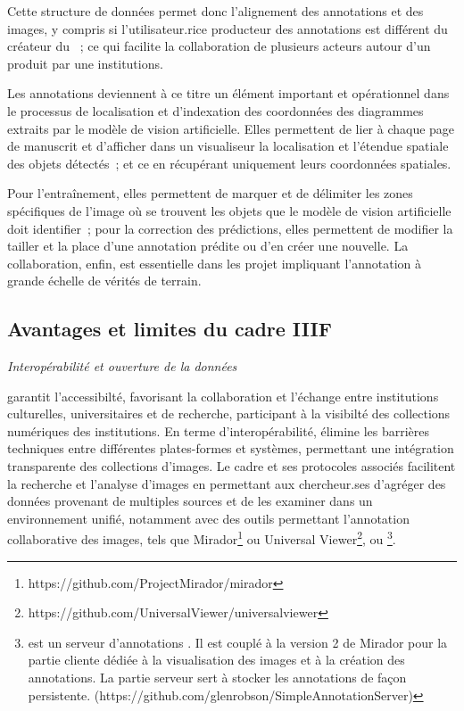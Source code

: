 Cette structure de données permet donc l'alignement des annotations et
des images, y compris si l'utilisateur.rice producteur des annotations est
différent du créateur du \man~; ce qui facilite la collaboration de plusieurs acteurs autour d'un \man produit
par une institutions.

Les annotations deviennent à ce titre un élément important et
opérationnel dans le processus de localisation et d'indexation des
coordonnées des diagrammes extraits par le modèle de vision
artificielle. Elles permettent de lier à chaque page de manuscrit et
d'afficher dans un visualiseur la localisation et l'étendue spatiale des objets détectés~; et ce en
récupérant uniquement leurs coordonnées spatiales.

Pour l'entraînement, elles permettent de marquer et de délimiter les
zones spécifiques de l'image où se trouvent les objets que le modèle de
vision artificielle doit identifier~; pour la correction des
prédictions, elles permettent de modifier la tailler et la place d'une
annotation prédite ou d'en créer une nouvelle. La collaboration, enfin,
est essentielle dans les projet impliquant l'annotation à grande échelle
de vérités de terrain.

\hypertarget{avantages-et-limites-du-cadre-iiif}{%
\subsection{Avantages et limites du cadre
IIIF}\label{avantages-et-limites-du-cadre-iiif}}

\emph{Interopérabilité et ouverture de la données}

\iiif garantit l'accessibilté, favorisant la collaboration et l'échange
entre institutions culturelles, universitaires et de recherche,
participant à la visibilté des collections numériques des institutions.
En terme d'interopérabilité, \iiif élimine les barrières techniques entre
différentes plates-formes et systèmes, permettant une intégration
transparente des collections d'images. Le cadre et ses protocoles
associés facilitent la recherche et l'analyse d'images en permettant aux
chercheur.ses d'agréger des données provenant de multiples sources et de
les examiner dans un environnement unifié, notamment avec des outils
permettant l'annotation collaborative des images, tels que
Mirador\footnote{https://github.com/ProjectMirador/mirador} ou Universal
Viewer\footnote{https://github.com/UniversalViewer/universalviewer}, ou
\sas\footnote{\sas est un serveur d'annotations
  \iiif. Il est couplé à la version 2 de Mirador pour la partie cliente
  dédiée à la visualisation des images et à la création des annotations.
  La partie serveur sert à stocker les annotations de façon persistente.
  (https://github.com/glenrobson/SimpleAnnotationServer)}.

